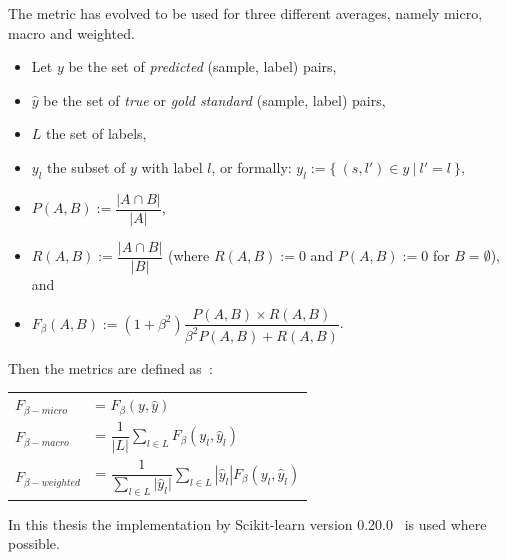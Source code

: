 The metric has evolved to be used for three different averages, namely micro, macro and weighted.
\begin{itemize}
    \item Let $y$ be the set of \textit{predicted} (sample, label) pairs,
    \item $\hat{y}$ be the set of \textit{true} or \textit{gold standard} (sample, label) pairs,
    \item $L$ the set of labels,
    \item $y_l$ the subset of $y$ with label $l$, or formally: $y_l := \{ \: (s, l') \in y \: | \: l' = l \: \}$,
    \item $P(A,B) := \dfrac{|A \cap B|}{|A|}$,
    \item $R(A,B) := \dfrac{|A \cap B|}{|B|}$ (where $R(A,B) := 0$ and $P(A,B) := 0$ for $B = \emptyset$), \hspace*{2mm} and
    \item $F_\beta(A, B) := (1 + \beta^2) \dfrac{P(A,B) \times R(A,B)}{\beta^2 P(A,B) + R(A,B)}$.
\end{itemize}

\noindent Then the metrics are defined as~\citep{scikit2019fscore}:

\begin{center}
    \begin{tabular}{l l}
        $F_{\beta-micro}$ &= $F_\beta(y, \hat{y})$ \\[4mm]
        $F_{\beta-macro}$ &= $\dfrac{1}{|L|} \sum_{l \in L} F_\beta(y_l, \hat{y}_l)$ \\[4mm]
        $F_{\beta-weighted}$ &= $\dfrac{1}{\sum_{l \in L}{|\hat{y}_l}|} \sum_{l \in L} | \hat{y}_l | F_\beta(y_l, \hat{y}_l)$
    \end{tabular}
\end{center}

In this thesis the implementation by Scikit-learn version 0.20.0~\citep{scikit2018classification} is used where possible.

